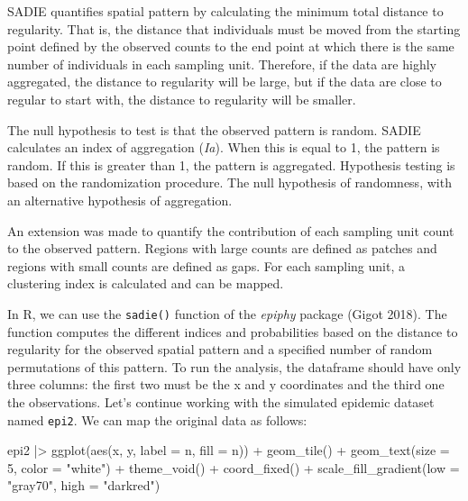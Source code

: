 \documentclass[
  letterpaper,
  DIV=11,
  numbers=noendperiod]{scrreprt}
\newenvironment{Shaded}{\begin{snugshade}}{\end{snugshade}}
\newcommand{\AttributeTok}[1]{\textcolor[rgb]{0.40,0.45,0.13}{#1}}
\newcommand{\DecValTok}[1]{\textcolor[rgb]{0.68,0.00,0.00}{#1}}
\newcommand{\FunctionTok}[1]{\textcolor[rgb]{0.28,0.35,0.67}{#1}}
\newcommand{\NormalTok}[1]{\textcolor[rgb]{0.00,0.23,0.31}{#1}}
\newcommand{\SpecialCharTok}[1]{\textcolor[rgb]{0.37,0.37,0.37}{#1}}
\newcommand{\StringTok}[1]{\textcolor[rgb]{0.13,0.47,0.30}{#1}}
\begin{document}
SADIE quantifies spatial pattern by calculating the minimum total
distance to regularity. That is, the distance that individuals must be
moved from the starting point defined by the observed counts to the end
point at which there is the same number of individuals in each sampling
unit. Therefore, if the data are highly aggregated, the distance to
regularity will be large, but if the data are close to regular to start
with, the distance to regularity will be smaller.

The null hypothesis to test is that the observed pattern is random.
SADIE calculates an index of aggregation (\emph{Ia}). When this is equal
to 1, the pattern is random. If this is greater than 1, the pattern is
aggregated. Hypothesis testing is based on the randomization procedure.
The null hypothesis of randomness, with an alternative hypothesis of
aggregation.

An extension was made to quantify the contribution of each sampling unit
count to the observed pattern. Regions with large counts are defined as
patches and regions with small counts are defined as gaps. For each
sampling unit, a clustering index is calculated and can be mapped.

In R, we can use the \texttt{sadie()} function of the \emph{epiphy}
package (Gigot 2018). The function computes the different indices and
probabilities based on the distance to regularity for the observed
spatial pattern and a specified number of random permutations of this
pattern. To run the analysis, the dataframe should have only three
columns: the first two must be the x and y coordinates and the third one
the observations. Let's continue working with the simulated epidemic
dataset named \texttt{epi2}. We can map the original data as follows:

\begin{Shaded}
\begin{Highlighting}[]
\NormalTok{epi2 }\SpecialCharTok{|\textgreater{}}
  \FunctionTok{ggplot}\NormalTok{(}\FunctionTok{aes}\NormalTok{(x, y, }\AttributeTok{label =}\NormalTok{ n, }\AttributeTok{fill =}\NormalTok{ n)) }\SpecialCharTok{+}
  \FunctionTok{geom\_tile}\NormalTok{() }\SpecialCharTok{+}
  \FunctionTok{geom\_text}\NormalTok{(}\AttributeTok{size =} \DecValTok{5}\NormalTok{, }\AttributeTok{color =} \StringTok{"white"}\NormalTok{) }\SpecialCharTok{+}
  \FunctionTok{theme\_void}\NormalTok{() }\SpecialCharTok{+}
  \FunctionTok{coord\_fixed}\NormalTok{() }\SpecialCharTok{+}
  \FunctionTok{scale\_fill\_gradient}\NormalTok{(}\AttributeTok{low =} \StringTok{"gray70"}\NormalTok{, }\AttributeTok{high =} \StringTok{"darkred"}\NormalTok{)}
\end{Highlighting}
\end{Shaded}
\end{document}
